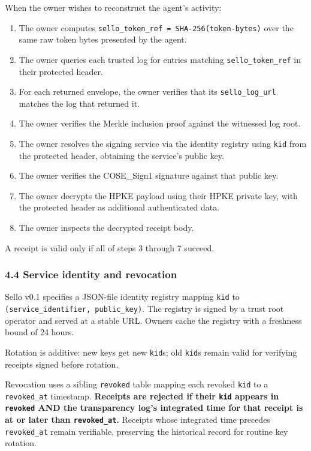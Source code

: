 \documentclass[
  11pt,
]{article}
\providecommand{\tightlist}{%
  \setlength{\itemsep}{0pt}\setlength{\parskip}{0pt}}
\begin{document}
When the owner wishes to reconstruct the agent's activity:

\begin{enumerate}
\def\labelenumi{\arabic{enumi}.}
\tightlist
\item
  The owner computes \texttt{sello\_token\_ref\ =\ SHA-256(token-bytes)}
  over the same raw token bytes presented by the agent.
\item
  The owner queries each trusted log for entries matching
  \texttt{sello\_token\_ref} in their protected header.
\item
  For each returned envelope, the owner verifies that its
  \texttt{sello\_log\_url} matches the log that returned it.
\item
  The owner verifies the Merkle inclusion proof against the witnessed
  log root.
\item
  The owner resolves the signing service via the identity registry using
  \texttt{kid} from the protected header, obtaining the service's public
  key.
\item
  The owner verifies the COSE\_Sign1 signature against that public key.
\item
  The owner decrypts the HPKE payload using their HPKE private key, with
  the protected header as additional authenticated data.
\item
  The owner inspects the decrypted receipt body.
\end{enumerate}

A receipt is valid only if all of steps 3 through 7 succeed.

\hypertarget{service-identity-and-revocation}{%
\subsubsection{4.4 Service identity and
revocation}\label{service-identity-and-revocation}}

Sello v0.1 specifies a JSON-file identity registry mapping \texttt{kid}
to \texttt{(service\_identifier,\ public\_key)}. The registry is signed
by a trust root operator and served at a stable URL. Owners cache the
registry with a freshness bound of 24 hours.

Rotation is additive: new keys get new \texttt{kid}s; old \texttt{kid}s
remain valid for verifying receipts signed before rotation.

Revocation uses a sibling \texttt{revoked} table mapping each revoked
\texttt{kid} to a \texttt{revoked\_at} timestamp. \textbf{Receipts are
rejected if their \texttt{kid} appears in \texttt{revoked} AND the
transparency log's integrated time for that receipt is at or later than
\texttt{revoked\_at}.} Receipts whose integrated time precedes
\texttt{revoked\_at} remain verifiable, preserving the historical record
for routine key rotation.
\end{document}
